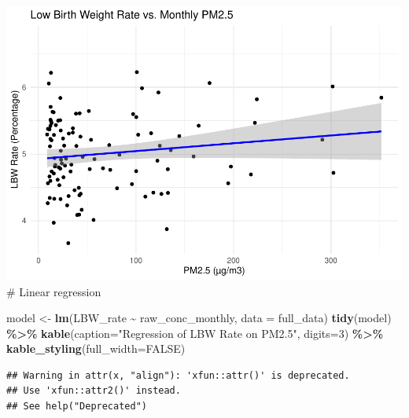 \documentclass[
]{article}
\newenvironment{Shaded}{\begin{snugshade}}{\end{snugshade}}
\newcommand{\AttributeTok}[1]{\textcolor[rgb]{0.13,0.29,0.53}{#1}}
\newcommand{\ConstantTok}[1]{\textcolor[rgb]{0.56,0.35,0.01}{#1}}
\newcommand{\DecValTok}[1]{\textcolor[rgb]{0.00,0.00,0.81}{#1}}
\newcommand{\FunctionTok}[1]{\textcolor[rgb]{0.13,0.29,0.53}{\textbf{#1}}}
\newcommand{\NormalTok}[1]{#1}
\newcommand{\OtherTok}[1]{\textcolor[rgb]{0.56,0.35,0.01}{#1}}
\newcommand{\SpecialCharTok}[1]{\textcolor[rgb]{0.81,0.36,0.00}{\textbf{#1}}}
\newcommand{\StringTok}[1]{\textcolor[rgb]{0.31,0.60,0.02}{#1}}
\begin{document}
\includegraphics{v_1_files/figure-latex/unnamed-chunk-2-1.pdf} \# Linear
regression

\begin{Shaded}
\begin{Highlighting}[]
\NormalTok{model }\OtherTok{\textless{}{-}} \FunctionTok{lm}\NormalTok{(LBW\_rate }\SpecialCharTok{\textasciitilde{}}\NormalTok{ raw\_conc\_monthly, }\AttributeTok{data =}\NormalTok{ full\_data)}
\FunctionTok{tidy}\NormalTok{(model) }\SpecialCharTok{\%\textgreater{}\%}
  \FunctionTok{kable}\NormalTok{(}\AttributeTok{caption=}\StringTok{"Regression of LBW Rate on PM2.5"}\NormalTok{, }\AttributeTok{digits=}\DecValTok{3}\NormalTok{) }\SpecialCharTok{\%\textgreater{}\%}
  \FunctionTok{kable\_styling}\NormalTok{(}\AttributeTok{full\_width=}\ConstantTok{FALSE}\NormalTok{)}
\end{Highlighting}
\end{Shaded}

\begin{verbatim}
## Warning in attr(x, "align"): 'xfun::attr()' is deprecated.
## Use 'xfun::attr2()' instead.
## See help("Deprecated")
\end{verbatim}
\end{document}
